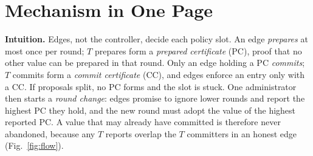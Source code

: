 \documentclass[conference]{IEEEtran}
\begin{document}
\section{Mechanism in One Page}
\textbf{Intuition.} Edges, not the controller, decide each policy slot. An edge \emph{prepares} at most once per round; $T$ prepares form a \emph{prepared certificate} (PC), proof that no other value can be prepared in that round. Only an edge holding a PC \emph{commits}; $T$ commits form a \emph{commit certificate} (CC), and edges enforce an entry only with a CC. If proposals split, no PC forms and the slot is stuck. One administrator then starts a \emph{round change}: edges promise to ignore lower rounds and report the highest PC they hold, and the new round must adopt the value of the highest reported PC. A value that may already have committed is therefore never abandoned, because any $T$ reports overlap the $T$ committers in an honest edge (Fig.~\ref{fig:flow}).
\end{document}
